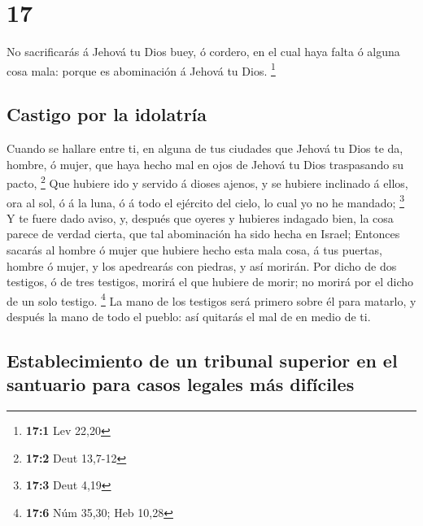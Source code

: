 \hypertarget{section-16}{%
\section{17}\label{section-16}}

 No sacrificarás á Jehová tu Dios buey, ó cordero, en el
cual haya falta ó alguna cosa mala: porque es abominación á Jehová tu
Dios. \footnote{\textbf{17:1} Lev 22,20}

\hypertarget{castigo-por-la-idolatruxeda}{%
\subsection{Castigo por la
idolatría}\label{castigo-por-la-idolatruxeda}}

 Cuando se hallare entre ti, en alguna de tus ciudades que
Jehová tu Dios te da, hombre, ó mujer, que haya hecho mal en ojos de
Jehová tu Dios traspasando su pacto, \footnote{\textbf{17:2} Deut
  13,7-12}  Que hubiere ido y servido á dioses ajenos, y
se hubiere inclinado á ellos, ora al sol, ó á la luna, ó á todo el
ejército del cielo, lo cual yo no he mandado; \footnote{\textbf{17:3}
  Deut 4,19}  Y te fuere dado aviso, y, después que oyeres
y hubieres indagado bien, la cosa parece de verdad cierta, que tal
abominación ha sido hecha en Israel;  Entonces sacarás al
hombre ó mujer que hubiere hecho esta mala cosa, á tus puertas, hombre ó
mujer, y los apedrearás con piedras, y así morirán.  Por
dicho de dos testigos, ó de tres testigos, morirá el que hubiere de
morir; no morirá por el dicho de un solo testigo. \footnote{\textbf{17:6}
  Núm 35,30; Heb 10,28}  La mano de los testigos será
primero sobre él para matarlo, y después la mano de todo el pueblo: así
quitarás el mal de en medio de ti.

\hypertarget{establecimiento-de-un-tribunal-superior-en-el-santuario-para-casos-legales-muxe1s-difuxedciles}{%
\subsection{Establecimiento de un tribunal superior en el santuario para
casos legales más
difíciles}\label{establecimiento-de-un-tribunal-superior-en-el-santuario-para-casos-legales-muxe1s-difuxedciles}}

